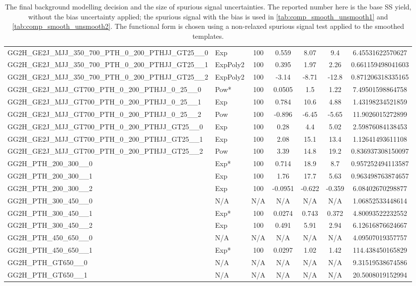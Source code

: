 \begin{table}[!h]
{\begin{tabular}{llccccS[table-format = 3.2, round-mode = places, round-precision = 2]}
 GG2H\_GE2J\_MJJ\_350\_700\_PTH\_0\_200\_PTHJJ\_GT25\_\_0 &Exp&100&0.559&8.07&9.4&6.45531622570627\\
 GG2H\_GE2J\_MJJ\_350\_700\_PTH\_0\_200\_PTHJJ\_GT25\_\_1 &ExpPoly2&100&0.395&1.97&2.26&0.661159498041603\\
 GG2H\_GE2J\_MJJ\_350\_700\_PTH\_0\_200\_PTHJJ\_GT25\_\_2 &ExpPoly2&100&-3.14&-8.71&-12.8&0.871206318335165\\
 GG2H\_GE2J\_MJJ\_GT700\_PTH\_0\_200\_PTHJJ\_0\_25\_\_0 &Pow*&100&0.0505&1.5&1.22&7.49501598864758\\
 GG2H\_GE2J\_MJJ\_GT700\_PTH\_0\_200\_PTHJJ\_0\_25\_\_1 &Exp&100&0.784&10.6&4.88&1.43198234521859\\
 GG2H\_GE2J\_MJJ\_GT700\_PTH\_0\_200\_PTHJJ\_0\_25\_\_2 &Pow&100&-0.896&-6.45&-5.65&11.9026015272899\\
 GG2H\_GE2J\_MJJ\_GT700\_PTH\_0\_200\_PTHJJ\_GT25\_\_0 &Exp&100&0.28&4.4&5.02&2.59876084138453\\
 GG2H\_GE2J\_MJJ\_GT700\_PTH\_0\_200\_PTHJJ\_GT25\_\_1 &Exp&100&2.08&15.1&13.4&1.12641493611108\\
 GG2H\_GE2J\_MJJ\_GT700\_PTH\_0\_200\_PTHJJ\_GT25\_\_2 &Pow&100&3.39&14.8&19.2&0.836937308150097\\
 GG2H\_PTH\_200\_300\_\_0 &Exp*&100&0.714&18.9&8.7&0.957252494113587\\
 GG2H\_PTH\_200\_300\_\_1 &Exp&100&1.76&17.7&5.63&0.963498763874657\\
 GG2H\_PTH\_200\_300\_\_2 &Exp&100&-0.0951&-0.622&-0.359&6.08402670298877\\
 GG2H\_PTH\_300\_450\_\_0 &N/A&N/A&N/A&N/A&N/A&1.06852533448614\\
 GG2H\_PTH\_300\_450\_\_1 &Exp*&100&0.0274&0.743&0.372&4.80093522232552\\
 GG2H\_PTH\_300\_450\_\_2 &Exp&100&0.491&5.91&2.94&6.12616876624667\\
 GG2H\_PTH\_450\_650\_\_0 &N/A&N/A&N/A&N/A&N/A&4.09507019357757\\
 GG2H\_PTH\_450\_650\_\_1 &Exp*&100&0.0297&1.02&1.42&114.438450165829\\
 GG2H\_PTH\_GT650\_\_0 &N/A&N/A&N/A&N/A&N/A&9.31519538674586\\
 GG2H\_PTH\_GT650\_\_1 &N/A&N/A&N/A&N/A&N/A&20.5008019152994\\
    \hline
      \hline
      \end{tabular}
}
      \caption{
The final background modelling decision and the size of spurious signal uncertainties. The reported number here is the base SS yield, without the bias uncertainty applied; the spurious signal with the bias is used in \ref{tab:comp_smooth_unsmooth1} and \ref{tab:comp_smooth_unsmooth2}. The functional form is chosen using a non-relaxed spurious signal test applied to the smoothed templates. \label{tab:spurious_sig_gptight} }
\end{table}


